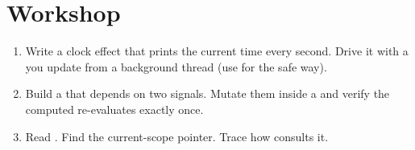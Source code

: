 \section*{Workshop}

\begin{enumerate}[leftmargin=*]
  \item Write a clock effect that prints the current time every
    second. Drive it with a  you update
    from a background thread (use  for the safe
    way).
  \item Build a  that depends on two signals.
    Mutate them inside a  and verify the computed
    re-evaluates exactly once.
  \item Read . Find the
     current-scope pointer. Trace how
     consults it.
\end{enumerate}
